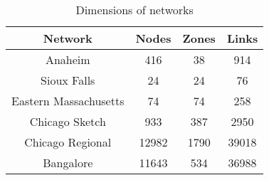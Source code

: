 \begin{table}[h!]
\caption{Dimensions of networks}
\label{table:networksdim}
\center
\begin{tabular}{|c|c|c|c|}
\hline
Network	&	Nodes	&	Zones	&	Links\\
\hline
Anaheim		&	416	&	38	&	914\\	
Sioux Falls	&	24	&	24	&	76\\
Eastern Massachusetts	&	74	&	74	&	258\\	
Chicago Sketch	&	933	&	387	&	2950\\
Chicago Regional	&	12982	&	1790	&	39018\\
Bangalore	&	11643	&	534	&	36988\\	
\hline
\end{tabular}
\end{table}
